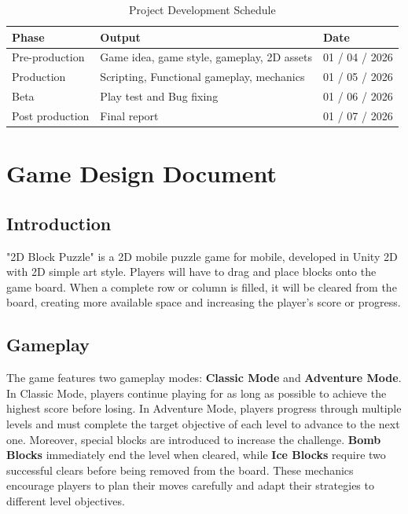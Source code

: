 \documentclass[a4paper,12pt]{report}
\begin{document}
\begin{table}[H]
\centering
\begin{tabular}{|p{3.5cm}|p{6cm}|p{3cm}|}
\hline
\textbf{Phase} & \textbf{Output} & \textbf{Date} \\ \hline

Pre-production &
Game idea, game style, gameplay, 2D assets &
01 / 04 / 2026 \\ \hline

Production &
Scripting, Functional gameplay, mechanics &
01 / 05 / 2026 \\ \hline

Beta &
Play test and Bug fixing &
01 / 06 / 2026 \\ \hline

Post production &
Final report &
01 / 07 / 2026 \\ \hline

\end{tabular}
\caption{Project Development Schedule}
\label{tab:development_schedule}
\end{table}

\section{Game Design Document}
\subsection{Introduction}
"2D Block Puzzle" is a 2D mobile puzzle game for mobile, developed in Unity 2D with 2D simple art style.  Players will have to drag and place blocks onto the game board. When a complete row or column is filled, it will be cleared from the board, creating more available space and increasing the player's score or progress.
\subsection{Gameplay}
The game features two gameplay modes: \textbf{Classic Mode} and \textbf{Adventure Mode}. In Classic Mode, players continue playing for as long as possible to achieve the highest score before losing. In Adventure Mode, players progress through multiple levels and must complete the target objective of each level to advance to the next one. Moreover, special blocks are introduced to increase the challenge. \textbf{Bomb Blocks} immediately end the level when cleared, while \textbf{Ice Blocks} require two successful clears before being removed from the board. These mechanics encourage players to plan their moves carefully and adapt their strategies to different level objectives.
\end{document}
